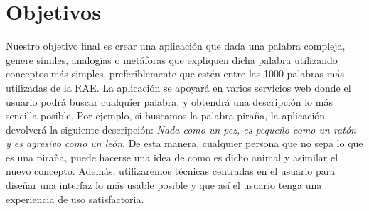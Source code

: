 \section{Objetivos}
\label{cap:sec:objetivos}
Nuestro objetivo final es crear una aplicación que dada una palabra compleja, genere símiles, analogías o metáforas que expliquen dicha palabra utilizando conceptos más simples, preferiblemente que estén entre las 1000 palabras más utilizadas de la RAE.
La aplicación se apoyará en varios servicios web donde el usuario podrá buscar cualquier palabra, y obtendrá una descripción lo más sencilla posible. Por ejemplo, si buscamos la palabra piraña, la aplicación devolverá la siguiente descripción:  \textit{Nada como un pez, es pequeño como un ratón y es agresivo como un león}. De esta manera, cualquier persona que no sepa lo que es una piraña, puede hacerse una idea de como es dicho animal y asimilar el nuevo concepto. Además, utilizaremos técnicas centradas en el usuario para diseñar una interfaz lo más usable posible y que así el usuario tenga una experiencia de uso satisfactoria.

